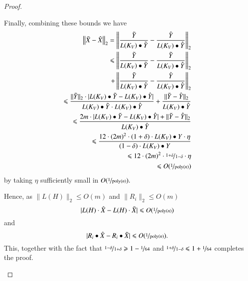 \documentclass[twoside,leqno,twocolumn]{article}
\newcommand{\nfrac}{\nicefrac}
\renewcommand{\leq}{\leqslant}
\renewcommand{\geq}{\geqslant}
\newcommand{\abs}[1]{\lvert#1\rvert}
\newcommand{\norm}[1]{\lVert#1\rVert}
\newcommand{\Norm}[1]{\left\lVert#1\right\rVert}
\newcommand{\poly}{\mathrm{poly}}
\newcommand{\normt}[1]{\norm{#1}_{\scriptstyle 2}}
\numberwithin{equation}{section}
\begin{document}
\begin{proof}
\begin{itemize}
Finally, combining these bounds we have
\begin{align*}
\Norm{\tilde{X} - \hat{X}}_2 =  \Norm{\frac{\tilde{Y}}{L(K_V) \bullet \tilde{Y}} - 
\frac{\hat{Y}}{L(K_V) \bullet \hat{Y}}}_2 
\\
\leq 
\Norm{\frac{\tilde{Y}}{L(K_V) \bullet \tilde{Y}} - \frac{\tilde{Y}}{L(K_V) \bullet \hat{Y}}}_2
\\ + 
\Norm{\frac{\tilde{Y}}{L(K_V) \bullet \hat{Y}} - \frac{\hat{Y}}{L(K_V) \bullet \hat{Y}}}_2\\
  \leq  
 \frac{\normt{\tilde{Y}} \cdot \abs{L(K_V) \bullet \tilde{Y} - L(K_V) \bullet \hat{Y}}}{L(K_V) \bullet \tilde{Y} \cdot L(K_V) \bullet \hat{Y}} +
\frac{\normt{\tilde{Y} - \hat{Y}}}{L(K_V) \bullet \hat{Y}} 
\\
\leq \frac{2m \cdot \abs{L(K_V) \bullet \tilde{Y} - L(K_V) \bullet \hat{Y}} + \normt{\tilde{Y} - \hat{Y}}}{L(K_V) \bullet \hat{Y}} \\
 \leq \frac{12 \cdot (2m)^2 \cdot (1+\delta) \cdot L(K_V) \bullet Y \cdot \eta}{(1-\delta) \cdot L(K_V) \bullet Y}
\\ \leq 12 \cdot (2m)^2 \cdot \nfrac{1+\delta}{1-\delta} \cdot \eta 
\\ \leq  O(\nfrac{1}{\poly(n)})
\end{align*}
by taking $\eta$ sufficiently small in $O(\nfrac{1}{\poly(n)}).$

Hence, as $\normt{L(H)} \leq O(m)$ and $\normt{R_i} \leq O(m)$
$$
|L(H) \cdot \hat{X} - L(H) \cdot \tilde{X}| \leq  O(\nfrac{1}{\poly(n)})
$$ 
and
$$
|R_i \bullet \hat{X} - R_i \bullet\tilde{X} | \leq  O(\nfrac{1}{\poly(n)}).
$$
This, together with the fact that $\nfrac{1-\delta}{1+\delta} \geq 1 - \nfrac{1}{64}$ and $\nfrac{1+\delta}{1-\delta} \leq 1 + \nfrac{1}{64}$ completes the proof.
\end{itemize}


\end{proof}
\end{document}
